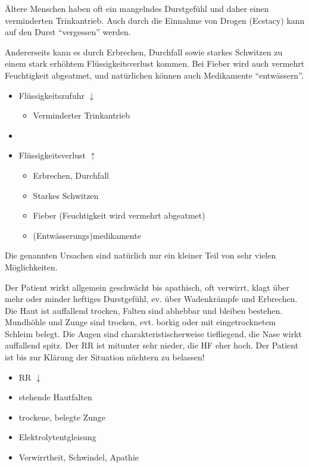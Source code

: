 \gMarried
{Ältere Menschen haben oft ein mangelndes Durstgefühl und daher
einen verminderten Trinkantrieb. Auch durch die Einnahme von
Drogen (Ecstacy) kann auf den Durst "`vergessen"' werden.  

Andererseits kann es durch Erbrechen, Durchfall sowie starkes Schwitzen zu
einem stark erhöhtem Flüssigkeitsverlust kommen. Bei Fieber wird auch vermehrt
Feuchtigkeit abgeatmet, und natürlichen können auch Medikamente "`entwässern"'.
}
{

\begin{itemize} %
\item Flüssigkeitszufuhr ${\downarrow}$
\begin{itemize}
    \item Verminderter Trinkantrieb
\end{itemize}\item 
\item Flüssigkeitsverlust ${\uparrow}$
\begin{itemize}
    \item Erbrechen, Durchfall
    \item Starkes Schwitzen
    \item Fieber (Feuchtigkeit wird vermehrt abgeatmet)
\item (Entwässerungs)medikamente
\end{itemize}
\end{itemize}
}

Die genannten Ursachen sind natürlich nur ein kleiner Teil von sehr vielen
Möglichkeiten.

\gMarried
{Der Patient wirkt allgemein geschwächt bis apathisch, oft verwirrt,
klagt über mehr oder minder heftiges Durstgefühl, ev. über Wadenkrämpfe und Erbrechen.
Die Haut ist auffallend trocken, Falten sind abhebbar und bleiben bestehen.
Mundhöhle und Zunge sind trocken, evt. borkig oder mit eingetrocknetem Schleim
belegt. Die Augen sind charakteristischerweise
tiefliegend, die Nase wirkt auffallend spitz. Der RR ist mitunter sehr nieder,
die HF eher hoch. Der Patient ist bis zur Klärung der Situation nüchtern zu
belassen! }
{

\begin{itemize}
\item RR ${\downarrow}$
\item stehende Hautfalten
\item trockene, belegte Zunge
\item Elektrolytentgleisung
\item Verwirrtheit, Schwindel, Apathie
\end{itemize}
}


